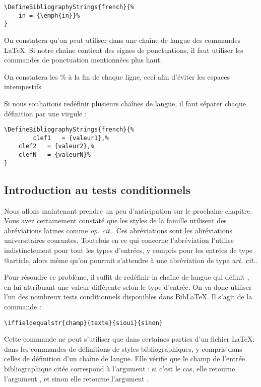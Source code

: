 	\begin{verbatim}
\DefineBibliographyStrings{french}{%
	in = {\emph{in}}%
}
	\end{verbatim}
	
	On constatera qu'on peut utiliser dans une chaîne de langue des commandes \LaTeX. Si notre chaîne contient des signes de ponctuations, il faut utiliser les commandes de ponctuation mentionnées plus haut.
	
	On constatera les \% à la fin de chaque ligne, ceci afin d'éviter les espaces intempestifs.
	
	Si nous souhaitons redéfinir plusieurs chaînes de langue, il faut séparer chaque définition par une virgule :
	
	\begin{verbatim}
\DefineBibliographyStrings{french}{%
      	clef1 	= {valeur1},%
	clef2	= {valeur2},%
	clefN	= {valeurN}%
}
	\end{verbatim}
	
\subsection{Introduction au tests conditionnels}

Nous allons maintenant prendre un peu d'anticipation sur le prochaine chapitre.
Vous avez certainement constaté que les styles de la famille  utilisent des abréviations latines comme \emph{op. cit.}.
Ces abréviations sont les abréviations universitaires courantes. Toutefois en ce qui concerne l'abréviation  l'utilise indistinctement pour tout les types d'entrées, y compris pour les entrées de type @article, alors même qu'on pourrait s'attendre à une abréviation de type \emph{art. cit.}.

Pour résoudre ce problème, il suffit de redéfinir la chaîne de langue qui définit , en lui attribuant une valeur différente selon le type d'entrée.  On va donc utiliser l'un des nombreux tests conditionnels disponibles dans BibLaTeX. Il s'agit de la commande :

\begin{verbatim}
\iffieldequalstr{champ}{texte}{sioui}{sinon}
\end{verbatim}

Cette commande ne peut s'utiliser que dans certaines parties d'un fichier \LaTeX : dans les commandes de définitions de styles bibliographiques, y compris dans celles de définition d'un chaîne de langue. 
Elle vérifie que le champ 	de l'entrée bibliographique citée correspond à l'argument  : si c'est le cas, elle retourne l'argument , et sinon elle retourne l'argument .

